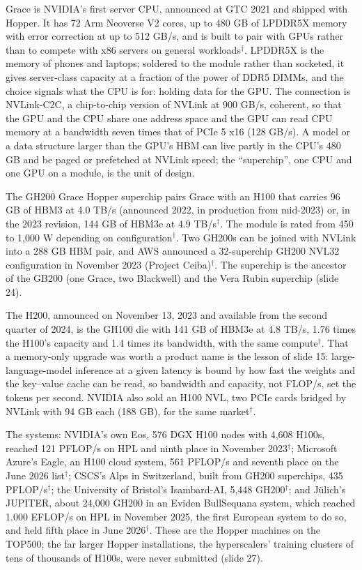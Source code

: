 \documentclass[11pt,letterpaper]{article}
\begin{document}
Grace is NVIDIA's first server CPU, announced at GTC 2021 and shipped with Hopper. It has 72 Arm Neoverse V2 cores, up to 480 GB of LPDDR5X memory with error correction at up to 512 GB/s, and is built to pair with GPUs rather than to compete with x86 servers on general workloads$^\dagger$. LPDDR5X is the memory of phones and laptops; soldered to the module rather than socketed, it gives server-class capacity at a fraction of the power of DDR5 DIMMs, and the choice signals what the CPU is for: holding data for the GPU. The connection is NVLink-C2C, a chip-to-chip version of NVLink at 900 GB/s, coherent, so that the GPU and the CPU share one address space and the GPU can read CPU memory at a bandwidth seven times that of PCIe 5 x16 (128 GB/s). A model or a data structure larger than the GPU's HBM can live partly in the CPU's 480 GB and be paged or prefetched at NVLink speed; the ``superchip'', one CPU and one GPU on a module, is the unit of design.

The GH200 Grace Hopper superchip pairs Grace with an H100 that carries 96 GB of HBM3 at 4.0 TB/s (announced 2022, in production from mid-2023) or, in the 2023 revision, 144 GB of HBM3e at 4.9 TB/s$^\dagger$. The module is rated from 450 to 1{,}000 W depending on configuration$^\dagger$. Two GH200s can be joined with NVLink into a 288 GB HBM pair, and AWS announced a 32-superchip GH200 NVL32 configuration in November 2023 (Project Ceiba)$^\dagger$. The superchip is the ancestor of the GB200 (one Grace, two Blackwell) and the Vera Rubin superchip (slide 24).

The H200, announced on November 13, 2023 and available from the second quarter of 2024, is the GH100 die with 141 GB of HBM3e at 4.8 TB/s, 1.76 times the H100's capacity and 1.4 times its bandwidth, with the same compute$^\dagger$. That a memory-only upgrade was worth a product name is the lesson of slide 15: large-language-model inference at a given latency is bound by how fast the weights and the key--value cache can be read, so bandwidth and capacity, not FLOP/s, set the tokens per second. NVIDIA also sold an H100 NVL, two PCIe cards bridged by NVLink with 94 GB each (188 GB), for the same market$^\dagger$.

The systems: NVIDIA's own Eos, 576 DGX H100 nodes with 4{,}608 H100s, reached 121 PFLOP/s on HPL and ninth place in November 2023$^\dagger$; Microsoft Azure's Eagle, an H100 cloud system, 561 PFLOP/s and seventh place on the June 2026 list$^\dagger$; CSCS's Alps in Switzerland, built from GH200 superchips, 435 PFLOP/s$^\dagger$; the University of Bristol's Isambard-AI, 5{,}448 GH200$^\dagger$; and J\"ulich's JUPITER, about 24{,}000 GH200 in an Eviden BullSequana system, which reached 1.000 EFLOP/s on HPL in November 2025, the first European system to do so, and held fifth place in June 2026$^\dagger$. These are the Hopper machines on the TOP500; the far larger Hopper installations, the hyperscalers' training clusters of tens of thousands of H100s, were never submitted (slide 27).
\end{document}
